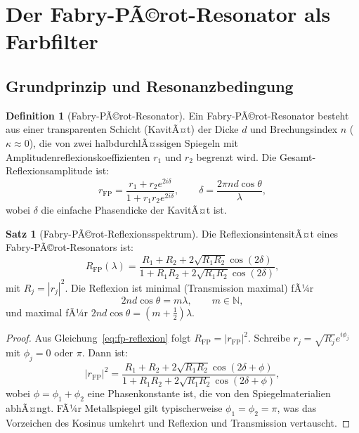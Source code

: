 ﻿\documentclass[a4paper,12pt]{article}
\theoremstyle{definition}
\newtheorem{definition}{Definition}[section]
\newtheorem{satz}{Satz}[section]
\begin{document}
	\section{Der Fabry-PÃ©rot-Resonator als Farbfilter}
	\label{sec:fabry-perot}
	
	\subsection{Grundprinzip und Resonanzbedingung}
	
	\begin{definition}[Fabry-PÃ©rot-Resonator]
		\label{def:fp-resonator}
		Ein Fabry-PÃ©rot-Resonator besteht aus einer transparenten Schicht
		(KavitÃ¤t) der Dicke $d$ und Brechungsindex $n$ ($\kappa \approx 0$),
		die von zwei halbdurchlÃ¤ssigen Spiegeln mit Amplitudenreflexionskoeffizienten
		$r_1$ und $r_2$ begrenzt wird. Die Gesamt-Reflexionsamplitude ist:
		\begin{equation}
			r_\mathrm{FP} = \frac{r_1 + r_2 e^{2i\delta}}{1 + r_1 r_2 e^{2i\delta}},
			\qquad \delta = \frac{2\pi n d \cos\theta}{\lambda},
			\label{eq:fp-reflexion}
		\end{equation}
		wobei $\delta$ die einfache Phasendicke der KavitÃ¤t ist.
	\end{definition}
	
	\begin{satz}[Fabry-PÃ©rot-Reflexionsspektrum]
		\label{satz:fp-spektrum}
		Die ReflexionsintensitÃ¤t eines Fabry-PÃ©rot-Resonators ist:
		\begin{equation}
			R_\mathrm{FP}(\lambda) = \frac{R_1 + R_2 + 2\sqrt{R_1 R_2}\cos(2\delta)}
			{1 + R_1 R_2 + 2\sqrt{R_1 R_2}\cos(2\delta)},
			\label{eq:fp-intensitaet}
		\end{equation}
		mit $R_j = |r_j|^2$. Die Reflexion ist minimal (Transmission maximal) fÃ¼r
		\begin{equation}
			2 n d \cos\theta = m\lambda, \qquad m \in \mathbb{N},
			\label{eq:fp-resonanz}
		\end{equation}
		und maximal fÃ¼r $2nd\cos\theta = (m + \tfrac{1}{2})\lambda$.
	\end{satz}
	
	\begin{proof}
		Aus Gleichung~\eqref{eq:fp-reflexion} folgt $R_\mathrm{FP} = |r_\mathrm{FP}|^2$.
		Schreibe $r_j = \sqrt{R_j} e^{i\phi_j}$ mit $\phi_j = 0$ oder $\pi$.
		Dann ist:
		\[
		|r_\mathrm{FP}|^2 = \frac{R_1 + R_2 + 2\sqrt{R_1 R_2}\cos(2\delta + \phi)}
		{1 + R_1 R_2 + 2\sqrt{R_1 R_2}\cos(2\delta + \phi)},
		\]
		wobei $\phi = \phi_1 + \phi_2$ eine Phasenkonstante ist, die von den
		Spiegelmaterialien abhÃ¤ngt. FÃ¼r Metallspiegel gilt typischerweise
		$\phi_1 = \phi_2 = \pi$, was das Vorzeichen des Kosinus umkehrt und
		Reflexion und Transmission vertauscht.
	\end{proof}
	
\end{document}
